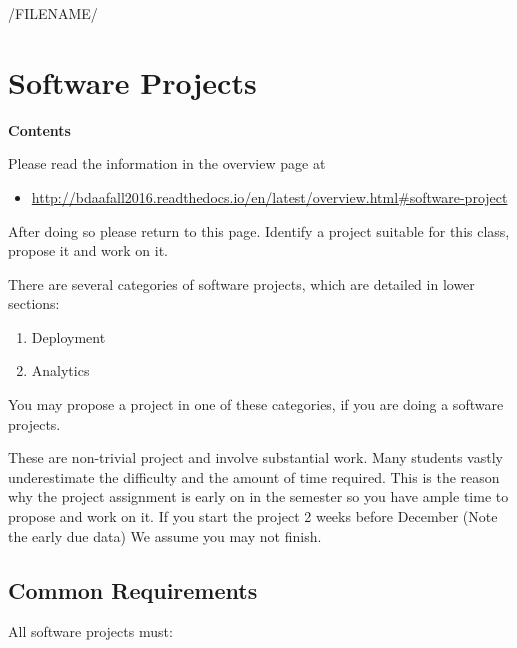 /FILENAME/
\section{Software Projects}\label{software-projects}

\textbf{Contents}

Please read the information in the overview page at

\begin{itemize}

\item
  \url{http://bdaafall2016.readthedocs.io/en/latest/overview.html\#software-project}
\end{itemize}

After doing so please return to this page. Identify a project suitable
for this class, propose it and work on it.

There are several categories of software projects, which are detailed in
lower sections:

\begin{enumerate}

\item
  Deployment
\item
  Analytics
\end{enumerate}

You may propose a project in one of these categories, if you are doing a
software projects.

These are non-trivial project and involve substantial work. Many
students vastly underestimate the difficulty and the amount of time
required. This is the reason why the project assignment is early on in
the semester so you have ample time to propose and work on it. If you
start the project 2 weeks before December (Note the early due data) We
assume you may not finish.

\subsection{Common Requirements}\label{common-requirements}

All software projects must:

